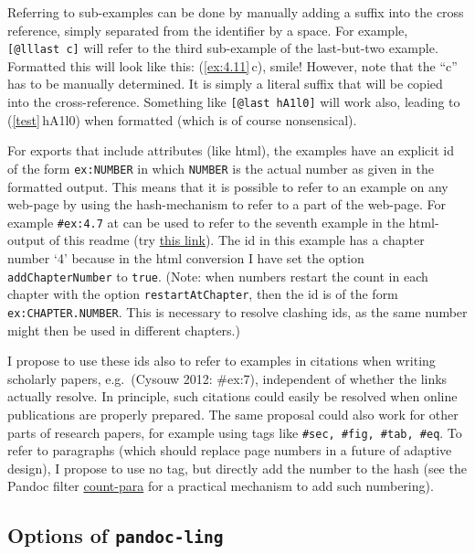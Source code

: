 \documentclass[
]{article}
\begin{document}
Referring to sub-examples can be done by manually adding a suffix into
the cross reference, simply separated from the identifier by a space.
For example, \texttt{{[}@lllast~c{]}} will refer to the third
sub-example of the last-but-two example. Formatted this will look like
this: (\ref{ex:4.11}\,c), smile! However, note that the ``c'' has to be
manually determined. It is simply a literal suffix that will be copied
into the cross-reference. Something like \texttt{{[}@last\ hA1l0{]}}
will work also, leading to (\ref{test}\,hA1l0) when formatted (which is
of course nonsensical).

For exports that include attributes (like html), the examples have an
explicit id of the form \texttt{ex:NUMBER} in which \texttt{NUMBER} is
the actual number as given in the formatted output. This means that it
is possible to refer to an example on any web-page by using the
hash-mechanism to refer to a part of the web-page. For example
\texttt{\#ex:4.7} at can be used to refer to the seventh example in the
html-output of this readme (try
\href{https://gitcdn.link/repo/cysouw/pandoc-ling/main/tests/readme.html\#ex:4.7}{this
link}). The id in this example has a chapter number `4' because in the
html conversion I have set the option \texttt{addChapterNumber} to
\texttt{true}. (Note: when numbers restart the count in each chapter
with the option \texttt{restartAtChapter}, then the id is of the form
\texttt{ex:CHAPTER.NUMBER}. This is necessary to resolve clashing ids,
as the same number might then be used in different chapters.)

I propose to use these ids also to refer to examples in citations when
writing scholarly papers, e.g.~(Cysouw 2012: \#ex:7), independent of
whether the links actually resolve. In principle, such citations could
easily be resolved when online publications are properly prepared. The
same proposal could also work for other parts of research papers, for
example using tags like \texttt{\#sec,\ \#fig,\ \#tab,\ \#eq}. To refer
to paragraphs (which should replace page numbers in a future of adaptive
design), I propose to use no tag, but directly add the number to the
hash (see the Pandoc filter
\href{https://github.com/cysouw/count-para}{count-para} for a practical
mechanism to add such numbering).

\hypertarget{options-of-pandoc-ling}{%
\subsection{\texorpdfstring{Options of
\texttt{pandoc-ling}}{Options of pandoc-ling}}\label{options-of-pandoc-ling}}
\end{document}

